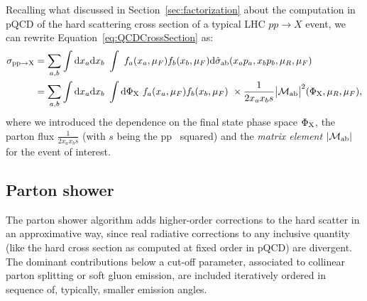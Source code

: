 Recalling what discussed in Section~\ref{sec:factorization} about the computation in pQCD
of the hard scattering cross section of a typical LHC $pp\to X$ event, we can rewrite
Equation~\ref{eq:QCDCrossSection} as:
\begin{equation}
\begin{split}
  \sigma_{{\rm pp}\to{\rm X}}
  & = \sum_{a,b}%
  \int{\rm d}x_a{\rm d}x_b
  ~ \int
  ~ f_a(x_a,\mu_{F}) f_b(x_b,\mu_{F})
  {\rm d}\hat{\sigma}_{\rm ab}(x_ap_a, x_bp_b,\mu_R,\mu_{F}) \\
  & = \sum_{a,b}%
  \int{\rm d}x_a{\rm d}x_b
  ~ \int{\rm d}\Phi_{\rm X}
  ~ f_a(x_a,\mu_{F}) f_b(x_b,\mu_{F})
  ~ \times \dfrac{1}{2x_ax_bs}\big|\mathcal{M}_{\rm ab}\big|^2(\Phi_{\rm X},\mu_R,\mu_{F}),  \\
\end{split}
\label{eq:matrixelement1}
\end{equation}
where we introduced the dependence on the final state phase space $\Phi_{\rm X}$, the parton flux
$\frac{1}{2x_ax_bs}$ (with $s$ being the pp \cme\ squared) and the {\it matrix element} $|\mathcal{M}_{\rm ab}|$
for the event of interest.




\subsection{Parton shower}\label{sec:partonshower}

The parton shower algorithm adds higher-order corrections 
to the hard scatter in an approximative way,
since real radiative corrections to any inclusive quantity (like the hard cross section as computed at
fixed order in pQCD) are divergent. The dominant contributions below a cut-off parameter, associated to 
collinear parton splitting or soft gluon emission, are included iteratively ordered in sequence of, typically, smaller emission angles.

